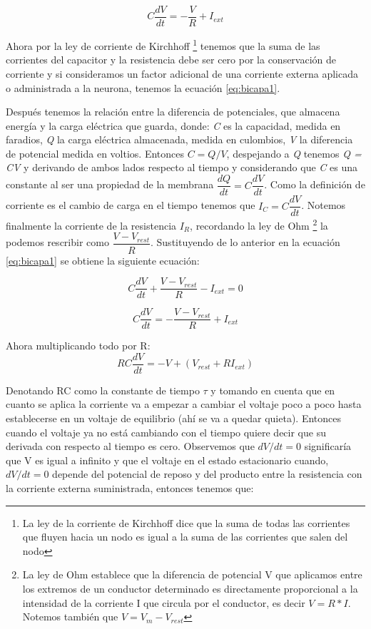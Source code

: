 \begin{equation*}
    C\dfrac{dV}{dt} = -\dfrac{V}{R} + I_{ext} 
\end{equation*}

Ahora por la ley de corriente de Kirchhoff \footnote{La ley de la corriente de Kirchhoff dice que la suma de todas las corrientes que fluyen hacia un nodo es igual a la suma de las corrientes que salen del nodo} tenemos que la suma de las corrientes del capacitor y la resistencia debe ser cero
por la conservación de corriente y si consideramos un factor adicional de una corriente externa aplicada o administrada a la neurona, tenemos la ecuación \ref{eq:bicapa1}.

Después tenemos la relación entre la diferencia de potenciales, que almacena energía y la carga eléctrica que guarda, donde: \emph{C} es la capacidad, medida en faradios, \emph{Q} la carga eléctrica almacenada, medida en culombios, \emph{V} la diferencia de potencial medida en voltios. Entonces \(C = Q/V\), despejando a \emph{Q} tenemos \emph{Q = CV} y derivando de ambos lados respecto al tiempo y considerando que \emph{C} es una constante al ser una propiedad de la membrana \(\dfrac{dQ}{dt} = C\dfrac{dV}{dt}\). Como la definición de corriente es el cambio de carga en el tiempo tenemos que \(I_{C} = C\dfrac{dV}{dt}\). Notemos finalmente la corriente de la resistencia \(I_{R}\), recordando la ley de Ohm \footnote{La ley de Ohm establece que la diferencia de potencial V que aplicamos entre los extremos de un conductor determinado es directamente proporcional a la intensidad de la corriente I que circula por el conductor, es decir \(V = R * I\). Notemos también que \(V = V_{m} - V_{rest}\) } la podemos rescribir como \(\dfrac{V-V_{rest}}{R}\). Sustituyendo de lo anterior en la ecuación \ref{eq:bicapa1} se obtiene la siguiente ecuación:

\begin{equation}
 C\dfrac{dV}{dt} + \dfrac{V-V_{rest}}{R} - I_{ext} = 0
 \label{eq:bicapa3}
\end{equation}

\begin{equation*}
 C\dfrac{dV}{dt} = -\dfrac{V-V_{rest}}{R} + I_{ext} 
\end{equation*}

Ahora multiplicando todo por R:
\begin{equation}
 RC\dfrac{dV}{dt} = -V + (V_{rest} + RI_{ext}) 
 \label{eq:bicapa4}
\end{equation}

Denotando RC como la constante de tiempo \(\tau\) y tomando en cuenta que en cuanto se aplica la corriente va a empezar a cambiar el voltaje poco a poco hasta establecerse en un voltaje de equilibrio (ahí se va a quedar quieta). Entonces cuando el voltaje ya no está cambiando con el tiempo quiere decir que su derivada con respecto al tiempo es cero. Observemos que \(dV/dt = 0\) significaría que V es igual a infinito y que el voltaje en el estado estacionario cuando, \(dV/dt = 0\) depende del potencial de reposo y del producto entre la resistencia con la corriente externa suministrada, entonces tenemos que:

